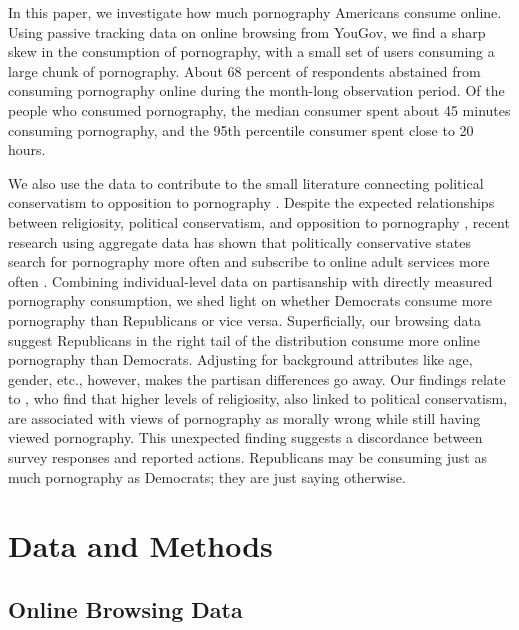 \documentclass[12pt, letterpaper]{article}
\begin{document}
In this paper, we investigate how much pornography Americans consume online. Using passive tracking data on online browsing from YouGov, we find a sharp skew in the consumption of pornography, with a small set of users consuming a large chunk of pornography. About 68 percent of respondents abstained from consuming pornography online during the month-long observation period. Of the people who consumed pornography, the median consumer spent about 45 minutes consuming pornography, and the 95th percentile consumer spent close to 20 hours. %

We also use the data to contribute to the small literature connecting political conservatism to opposition to pornography \citep{Peek1982-ua, Woodrum1992-vk}. Despite the expected relationships between religiosity, political conservatism, and opposition to pornography \citep{Wright2013-an, Perry2018-cn}, recent research using aggregate data has shown that politically conservative states search for pornography more often and subscribe to online adult services more often \citep{macinnis2015american, edelman2009markets}. Combining individual-level data on partisanship with directly measured pornography consumption, we shed light on whether Democrats consume more pornography than Republicans or vice versa. Superficially, our browsing data suggest Republicans in the right tail of the distribution consume more online pornography than Democrats. Adjusting for background attributes like age, gender, etc., however, makes the partisan differences go away. Our findings relate to \cite{Perry2018-cn}, who find that higher levels of religiosity, also linked to political conservatism, are associated with views of pornography as morally wrong while still having viewed pornography. This unexpected finding suggests a discordance between survey responses and reported actions. Republicans may be consuming just as much pornography as Democrats; they are just saying otherwise. 

\section{Data and Methods}
\label{sec:data}

\subsection{Online Browsing Data}
\label{subsec:online_browse_data}
\end{document}
